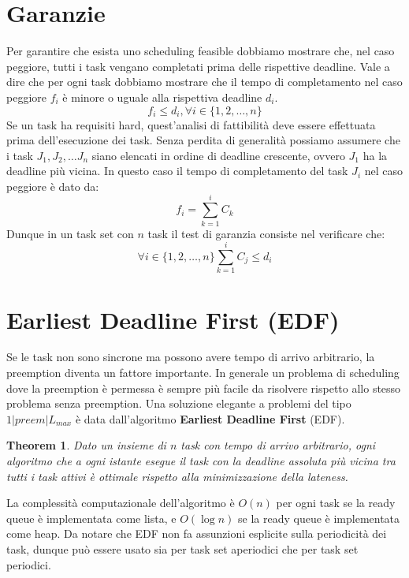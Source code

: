 \documentclass[12pt,openany,onesided]{book}
\newtheorem{theorem}{Theorem}
\begin{document}
\section{Garanzie}
Per garantire che esista uno scheduling feasible dobbiamo mostrare che, nel caso peggiore, tutti i task vengano completati prima delle rispettive deadline.
Vale a dire che per ogni task dobbiamo mostrare che il tempo di completamento nel caso peggiore $f_i$ è minore o uguale alla rispettiva deadline $d_i$.
\begin{equation}
    f_i \leq d_i , \forall i \in \{1,2,\ldots,n\}
\end{equation}
Se un task ha requisiti hard, quest'analisi di fattibilità deve essere effettuata prima dell'esecuzione dei task.
Senza perdita di generalità possiamo assumere che i task $J_1,J_2,\dots J_n$ siano elencati in ordine di deadline crescente, ovvero $J_1$ ha la deadline più vicina.
In questo caso il tempo di completamento del task $J_i$ nel caso peggiore è dato da:
\begin{equation}
    f_i=\sum_{k=1}^{i} C_k
\end{equation}
Dunque in un task set con $n$ task il test di garanzia consiste nel verificare che:
\begin{equation}
    \forall i \in \{1,2,\dots ,n\} \sum_{k=1}^i C_j \leq d_i
\end{equation}
\section{Earliest Deadline First (EDF)}
Se le task non sono sincrone ma possono avere tempo di arrivo arbitrario, la preemption diventa un fattore importante.
In generale un problema di scheduling dove la preemption è permessa è sempre più facile da risolvere rispetto allo stesso problema senza preemption.
Una soluzione elegante a problemi del tipo $1|preem|L_{max}$ è data dall'algoritmo \textbf{Earliest Deadline First} (EDF).
\begin{theorem}
    Dato un insieme di $n$ task con tempo di arrivo arbitrario, ogni algoritmo che a ogni istante esegue il task con la deadline assoluta più vicina tra tutti i task attivi è ottimale rispetto alla minimizzazione della lateness.
\end{theorem}
La complessità computazionale dell'algoritmo è $O(n)$ per ogni task se la ready queue è implementata come lista, e $O(\log n)$ se la ready queue è implementata come heap.
Da notare che EDF non fa assunzioni esplicite sulla periodicità dei task, dunque può essere usato sia per task set aperiodici che per task set periodici.
\end{document}
